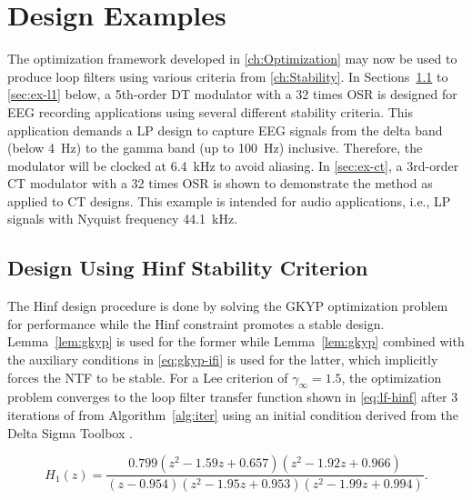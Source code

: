
\chapter{Design Examples}
\label{ch:Examples}

The optimization framework developed in \autoref{ch:Optimization} may now be used to produce loop filters using various criteria from \autoref{ch:Stability}. In Sections~\ref{sec:ex-hinf} to \ref{sec:ex-l1} below, a 5th-order \gls{DT} modulator with a 32 times \gls{OSR} is designed for \gls{EEG} recording applications using several different stability criteria. This application demands a \gls{LP} design to capture \gls{EEG} signals from the delta band (below \SI{4}{\hertz}) to the gamma band (up to \SI{100}{\hertz}) inclusive. Therefore, the modulator will be clocked at \SI{6.4}{\kilo\hertz} to avoid aliasing. In \autoref{sec:ex-ct}, a 3rd-order \gls{CT} modulator with a 32 times \gls{OSR} is shown to demonstrate the method as applied to \gls{CT} designs. This example is intended for audio applications, i.e., \gls{LP} signals with Nyquist frequency \SI{44.1}{\kilo\hertz}.

\section{Design Using \gls{Hinf} Stability Criterion}
\label{sec:ex-hinf}

The \gls{Hinf} design procedure is done by solving the \gls{GKYP} optimization problem for performance while the \gls{Hinf} constraint promotes a stable design. Lemma~\ref{lem:gkyp} is used for the former while Lemma~\ref{lem:gkyp} combined with the auxiliary conditions in \autoref{eq:gkyp-ifi} is used for the latter, which implicitly forces the \gls{NTF} to be stable. For a Lee criterion of $\gamma_\infty = 1.5$, the optimization problem converges to the loop filter transfer function shown in \autoref{eq:lf-hinf} after 3 iterations of  from Algorithm~\ref{alg:iter} using an initial condition derived from the Delta Sigma Toolbox \cite[Appx. B]{Schreier1997}.

\begin{equation} \label{eq:lf-hinf}
	H_1(z) = \frac{0.799\left(z^2 - 1.59z + 0.657\right)\left(z^2 - 1.92z + 0.966\right)}{\left(z - 0.954\right)\left(z^2 - 1.95z + 0.953\right)\left(z^2 - 1.99z + 0.994\right)}.
\end{equation}

